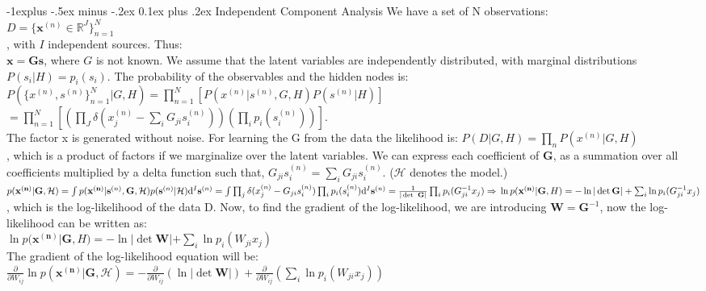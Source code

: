 \documentclass[9pt,landscape]{article}
\makeatletter
\renewcommand{\subsection}{\@startsection{subsection}{2}{0mm}%
                                {-1explus -.5ex minus -.2ex}%
                                {0.1ex plus .2ex}%
                                {\normalfont\scriptsize\bfseries}}
\makeatother
\begin{document}
\begin{multicols}{3}
\subsection{Independent Component Analysis}
We have a set of N observations:\\
$D = \lbrace \mathbf{x}^{(n)} \in \mathbb{R}^J \rbrace ^{N}_{n=1}$\\
, with $I$ independent sources. Thus:\\
$\mathbf{x} = \mathbf{G}\mathbf{s}$, where $G$ is not known. We assume that the latent variables are independently distributed, with marginal distributions $P(s_i|H) = p_i(s_i)$. The probability of the observables and the hidden nodes is:\\
$P(\lbrace x^{(n)},s^{(n)} \rbrace_{n=1}^{N}|G,H) = \prod_{n=1}^N[P(x^{(n)}|s^{(n)},G,H)P(s^{(n)}|H)]$\\
$= \prod_{n=1}^N[(\prod_J \delta(x_j^{(n)} - \sum_i G_{ji}s_i^{(n)}))(\prod_i p_i(s_i^{(n)}))]$.\\ The factor x is generated without noise. For learning the G from the data the likelihood is: $P(D|G,H) = \prod_n P(x^{(n)}|G,H)$\\
, which is a product of factors if we marginalize over the latent variables. We can express each coefficient of $\mathbf{G}$, as a summation over all coefficients multiplied by a delta function such that, $G_{ji}s_i^{(n)} = \sum_i G_{ji}s_i^{(n)}$. ($\mathcal{H}$ denotes the model.)\\
$
p(\mathbf{x^{(n)}} | \mathbf{G}, \mathcal{H}) = \int p(\mathbf{x^{(n)}} | \mathbf{s}^{(n)}, \mathbf{G}, \mathcal{H}) p(\mathbf{s}^{(n)}| \mathcal{H})  \mathrm{d}^I\mathbf{s}^{(n)}\\
= \int \prod_j \delta (x_j^{(n)} - G_{ji}s_i^{(n)}) \prod_i p_i(s_i^{(n)})\mathrm{d}^I\mathbf{s}^{(n)}\\
= \frac{1}{|\det\ \mathbf{G}|} \prod_i p_i(G_{ji}^{-1}x_j) \Rightarrow \\
\ln p(\mathbf{x^{(n)}} | \mathbf{G}, H) = -\ln |\det \mathbf{G}| + \sum_i \ln p_i(G_{ji}^{-1}x_j)
$\\
, which is the log-likelihood of the data D. Now, to find the gradient of the log-likelihood, we are introducing $\mathbf{W} = \mathbf{G}^{-1}$, now the log-likelihood can be written as:\\
$
\ln p(\mathbf{x^{(n)}} | \mathbf{G}, H) = -\ln |\det\mathbf{W}| + \sum_i \ln p_i(W_{ji}x_j)
$\\
The gradient of the log-likelihood equation will be:\\
$
\frac{\partial}{\partial W_{ij}}\ln p(\mathbf{x^{(n)}} | \mathbf{G}, \mathcal{H}) = -\frac{\partial}{\partial W_{ij}}(\ln|\det \mathbf{W}|) + \frac{\partial}{\partial W_{ij}}(\sum_i \ln p_i(W_{ji}x_j))
$


\end{multicols}
\end{document}
